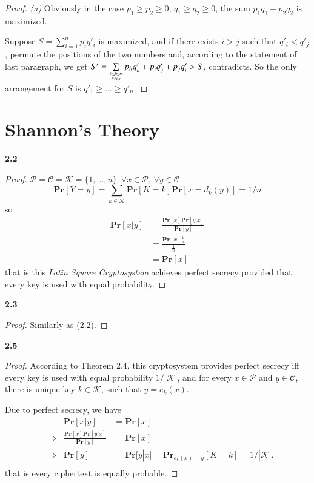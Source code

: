 \documentclass[12pt,a4paper]{article}
\newcommand{\pr}{\mathbf{Pr}}
\newcommand{\pp}{\mathscr{P}}
\newcommand{\pc}{\mathscr{C}}
\newcommand{\pk}{\mathscr{K}}
\theoremstyle{solution}
\begin{document}
\begin{proof}
{\em (a)}
Obviously in the case $p_1\geq p_2\geq 0,\, q_1\geq q_2\geq 0$, the sum $p_1 q_1 +p_2 q_2$ is maximized.

Suppose $S=\sum_{i=1}^n p_i q'_i$ is maximized, and if there exists $i>j$ such that $ q'_i<q'_j$, permute the positions of the two numbers and, according to the statement of last paragraph, we get $S'={\sum\limits_{{0\leq h\leq n}\atop{h\neq i,j}} p_h q'_h}+p_i q'_j +p_j q'_i > S$, contradicts. So the only arrangement for $S$ is $q'_1\geq \ldots \geq q'_n$.
\end{proof}

%

\section{Shannon's Theory}

\textbf{2.2}

\begin{proof}
$\pp= \pc = \pk= \{1,\ldots,n\}.\ \forall x \in \pp,\, \forall y \in \pc$
$$\pr [ Y=y ] = \sum_{k\in \pk } \pr [ K=k ] \pr [ x=d_k (y) ] = 1/n$$
so
\begin{align*}
\pr [x|y]&=\frac{\pr[x] \pr[y|x]}{\pr[y]}\\
          &=\frac{\pr[x] \frac{1}{n}}{\frac{1}{n}}\\
          &=\pr[x]
\end{align*}
that is this {\slshape Latin Square Cryptosystem} achieves perfect secrecy provided that every  key is used with equal probability.
\end{proof}

\textbf{2.3}

\begin{proof} Similarly as (2.2).\end{proof}

\textbf{2.5}

\begin{proof}
According to Theorem 2.4, this cryptosystem provides perfect secrecy iff every key is used with equal probability $1/|\pk|$, and for every $x\in \pp$ and $y\in \pc$, there is unique key $k\in \pk$, such that $y=e_k(x)$.

Due to perfect secrecy, we have
\begin{align*}
  &  &\pr[x|y]&=\pr[x]\\
  &\Longrightarrow &\frac{\pr[x] \pr[y|x]}{\pr[y]}&=\pr[x]\\
  &\Longrightarrow &  \pr[y]&=\pr[y|x]=\pr_{e_k(x)=y}[K=k]=1/|\pk|.\\
\end{align*}
that is every ciphertext is equally probable.
\end{proof}
\end{document}
